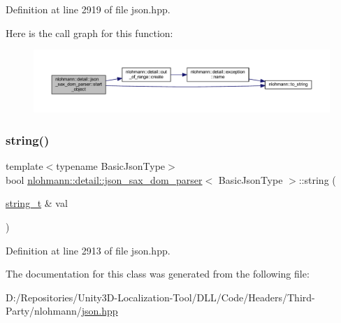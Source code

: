 Definition at line 2919 of file json.\+hpp.

Here is the call graph for this function\+:
\nopagebreak
\begin{figure}[H]
\begin{center}
\leavevmode
\includegraphics[width=350pt]{classnlohmann_1_1detail_1_1json__sax__dom__parser_a9929b4cc92d471c49bd0a92802629f90_cgraph}
\end{center}
\end{figure}
\mbox{\label{classnlohmann_1_1detail_1_1json__sax__dom__parser_a851d965082d20a726138f5d0330dc7d8}} 
\subsubsection{\texorpdfstring{string()}{string()}}
{\footnotesize\ttfamily template$<$typename Basic\+Json\+Type$>$ \\
bool \mbox{\hyperlink{classnlohmann_1_1detail_1_1json__sax__dom__parser}{nlohmann\+::detail\+::json\+\_\+sax\+\_\+dom\+\_\+parser}}$<$ Basic\+Json\+Type $>$\+::string (\begin{DoxyParamCaption}\item[{\mbox{\hyperlink{classnlohmann_1_1detail_1_1json__sax__dom__parser_afd4d961ab2a6b01cbe6e840f7fb90cdc}{string\+\_\+t}} \&}]{val }\end{DoxyParamCaption})\hspace{0.3cm}{\ttfamily [inline]}}



Definition at line 2913 of file json.\+hpp.



The documentation for this class was generated from the following file\+:\begin{DoxyCompactItemize}
\item 
D\+:/\+Repositories/\+Unity3\+D-\/\+Localization-\/\+Tool/\+D\+L\+L/\+Code/\+Headers/\+Third-\/\+Party/nlohmann/\mbox{\hyperlink{json_8hpp}{json.\+hpp}}\end{DoxyCompactItemize}

